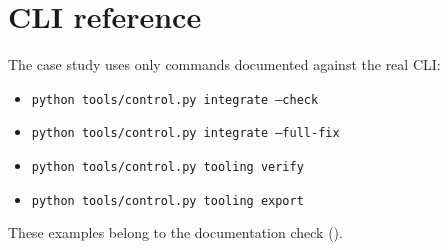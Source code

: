 \section{CLI reference}
\label{app:cli-reference}

The case study uses only commands documented against the real CLI:
\begin{itemize}
  \item \texttt{python tools/control.py integrate --check}
  \item \texttt{python tools/control.py integrate --full-fix}
  \item \texttt{python tools/control.py tooling verify}
  \item \texttt{python tools/control.py tooling export}
\end{itemize}
These examples belong to the
\Verified{} documentation check ().
